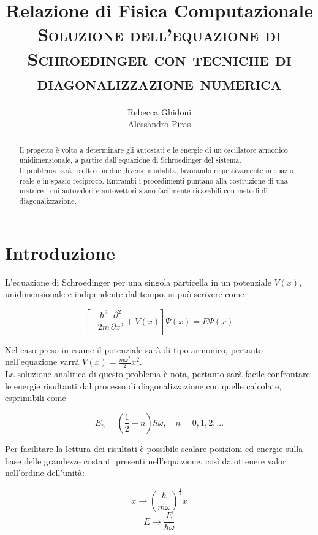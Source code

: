 \documentclass[a4paper,11pt]{article}
\title{Relazione di Fisica Computazionale \\ 
    \textsc{Soluzione dell'equazione di Schroedinger con tecniche di diagonalizzazione numerica}
    }
\author{Rebecca Ghidoni \\ Alessandro Piras}
\begin{document}
\maketitle

\begin{abstract}
Il progetto è volto a determinare gli autostati e le energie di un oscillatore armonico unidimensionale, a partire dall'equazione di Schroedinger del sistema. \\
Il problema sarà risolto con due diverse modalita, lavorando rispettivamente in spazio reale e in spazio reciproco. Entrambi i procedimenti puntano alla costruzione di una matrice i cui autovalori e autovettori siano facilmente ricavabili con metodi di diagonalizzazione.

\end{abstract}

\section*{Introduzione}
L'equazione di Schroedinger per una singola particella in un potenziale $V(x)$, unidimensionale e indipendente dal tempo, si può scrivere come 

\begin{equation}
\left[- \frac{\hbar^2}{2m}\frac{\partial^2}{\partial x^2} + V(x) \right] \Psi(x) = E\Psi(x)
\end{equation}

Nel caso preso in esame il potenziale sarà di tipo armonico, pertanto nell'equazione varrà $V(x) = \frac{m \omega^2}{2}x^2$. \\

La soluzione analitica di questo problema è nota, pertanto sarà facile confrontare le energie risultanti dal processo di diagonalizzazione con quelle calcolate, esprimibili come

\begin{equation}
E_n = (\frac{1}{2} + n) \hbar \omega, \quad n = 0, 1, 2, ...
\end{equation}

Per facilitare la lettura dei risultati è possibile scalare posizioni ed energie sulla base delle grandezze costanti presenti nell'equazione, così da ottenere valori nell'ordine dell'unità:

\begin{equation}
x \rightarrow \left( \frac{\hbar}{m\omega} \right)^\frac{1}{2} x
\end{equation}
\begin{equation} 
E \rightarrow \frac{E}{\hbar \omega}
\end{equation}
\end{document}
